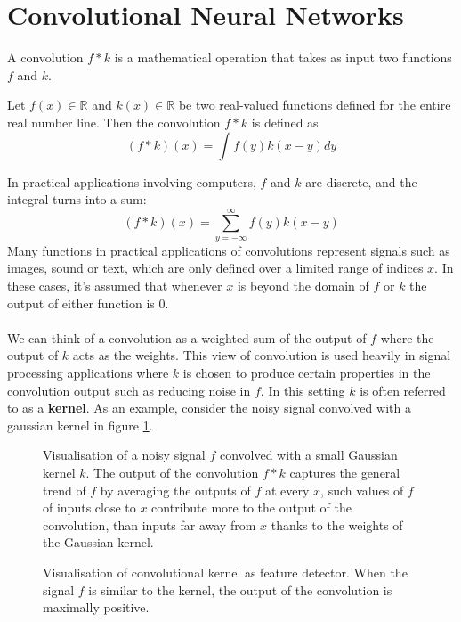 \section{Convolutional Neural Networks}
A convolution $f * k$ is a mathematical operation that takes as input two functions $f$ and $k$.

\begin{definition}[convolution] \label{convolution}
	Let $f(x) \in \mathbb{R}$ and $k(x) \in \mathbb{R}$ be two real-valued functions defined for the entire real number line. Then the convolution $f * k$ is defined as
	$$
		(f * k)(x) = \int f(y)k(x - y)dy
	$$
\end{definition}

In practical applications involving computers, $f$ and $k$ are discrete, and the integral turns into a sum:
$$
(f * k)(x) = \sum\limits_{y=-\infty}^\infty f(y)k(x - y)
$$
Many functions in practical applications of convolutions represent signals such as images, sound or text, which are only defined over a limited range of indices $x$. In these cases, it's assumed that whenever $x$ is beyond the domain of $f$ or $k$ the output of either function is 0.
\\\\
We can think of a convolution as a weighted sum of the output of $f$ where the output of $k$ acts as the weights. This view of convolution is used heavily in signal processing applications where $k$ is chosen to produce certain properties in the convolution output such as reducing noise in $f$. In this setting $k$ is often referred to as a \textbf{kernel}. As an example, consider the noisy signal convolved with a gaussian kernel in figure \ref{gaussian_convolution}.

\begin{figure}
	\centering
	
	\caption{Visualisation of a noisy signal $f$ convolved with a small Gaussian kernel $k$. The output of the convolution $f * k$ captures the general trend of $f$ by averaging the outputs of $f$ at every $x$, such values of $f$ of inputs close to $x$ contribute more to the output of the convolution, than inputs far away from $x$ thanks to the weights of the Gaussian kernel.}
	\label{gaussian_convolution}
\end{figure}

\begin{figure}
	\centering
	
	\caption{Visualisation of convolutional kernel as feature detector. When the signal $f$ is similar to the kernel, the output of the convolution is maximally positive.}
	\label{feature_detector}
\end{figure}

